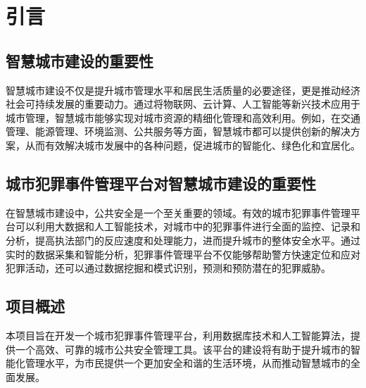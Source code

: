 \section{引言}\label{sec:introduction}

\subsection{智慧城市建设的重要性}

智慧城市建设不仅是提升城市管理水平和居民生活质量的必要途径，更是推动经济社会可持续发展的重要动力。通过将物联网、云计算、人工智能等新兴技术应用于城市管理，智慧城市能够实现对城市资源的精细化管理和高效利用。例如，在交通管理、能源管理、环境监测、公共服务等方面，智慧城市都可以提供创新的解决方案，从而有效解决城市发展中的各种问题，促进城市的智能化、绿色化和宜居化。

\subsection{城市犯罪事件管理平台对智慧城市建设的重要性}

在智慧城市建设中，公共安全是一个至关重要的领域。有效的城市犯罪事件管理平台可以利用大数据和人工智能技术，对城市中的犯罪事件进行全面的监控、记录和分析，提高执法部门的反应速度和处理能力，进而提升城市的整体安全水平。通过实时的数据采集和智能分析，犯罪事件管理平台不仅能够帮助警方快速定位和应对犯罪活动，还可以通过数据挖掘和模式识别，预测和预防潜在的犯罪威胁。

\subsection{项目概述}

本项目旨在开发一个城市犯罪事件管理平台，利用数据库技术和人工智能算法，提供一个高效、可靠的城市公共安全管理工具。该平台的建设将有助于提升城市的智能化管理水平，为市民提供一个更加安全和谐的生活环境，从而推动智慧城市的全面发展。
